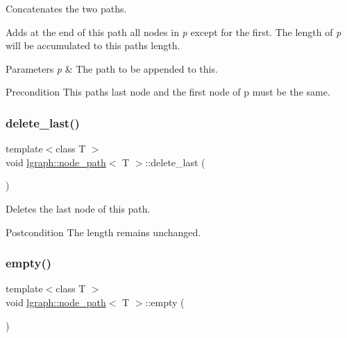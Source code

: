 Concatenates the two paths. 

Adds at the end of this path all nodes in {\itshape p} except for the first. The length of {\itshape p} will be accumulated to this path\textquotesingle{}s length.


\begin{DoxyParams}{Parameters}
{\em p} & The path to be appended to this. \\
\hline
\end{DoxyParams}
\begin{DoxyPrecond}{Precondition}
This path\textquotesingle{}s last node and the first node of p must be the same. 
\end{DoxyPrecond}
\mbox{\label{classlgraph_1_1node__path_a6b6f977475b90fda9ea44e6cfc05f40b}} 
\subsubsection{\texorpdfstring{delete\+\_\+last()}{delete\_last()}}
{\footnotesize\ttfamily template$<$class T $>$ \\
void \hyperlink{classlgraph_1_1node__path}{lgraph\+::node\+\_\+path}$<$ T $>$\+::delete\+\_\+last (\begin{DoxyParamCaption}{ }\end{DoxyParamCaption})}



Deletes the last node of this path. 

\begin{DoxyPostcond}{Postcondition}
The length remains unchanged. 
\end{DoxyPostcond}
\mbox{\label{classlgraph_1_1node__path_a8e11ffbd295bea9d10ebdd2180d68732}} 
\subsubsection{\texorpdfstring{empty()}{empty()}}
{\footnotesize\ttfamily template$<$class T $>$ \\
void \hyperlink{classlgraph_1_1node__path}{lgraph\+::node\+\_\+path}$<$ T $>$\+::empty (\begin{DoxyParamCaption}{ }\end{DoxyParamCaption})}



